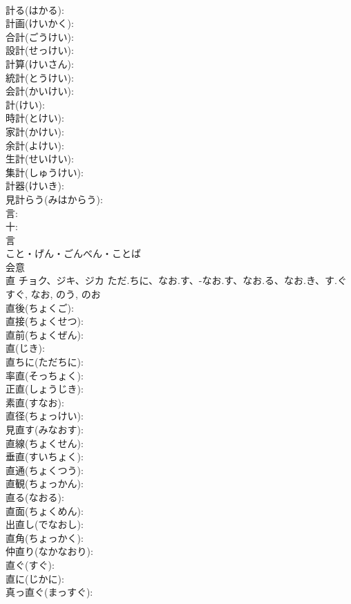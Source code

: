 \documentclass[8pt]{extreport}
\begin{document}
\begin{CJK}{UTF8}{min}
\\	計る(はかる): 
\\	計画(けいかく): 
\\	合計(ごうけい): 
\\	設計(せっけい): 
\\	計算(けいさん): 
\\	統計(とうけい): 
\\	会計(かいけい): 
\\	計(けい): 
\\	時計(とけい): 
\\	家計(かけい): 
\\	余計(よけい): 
\\	生計(せいけい): 
\\	集計(しゅうけい): 
\\	計器(けいき): 
\\	見計らう(みはからう): 
\\	言: 
\\	十: 
\\	言	
\\	こと・げん・ごんべん・ことば	
\\	会意 
\\	直	チョク、ジキ、ジカ	ただ.ちに、なお.す、-なお.す、なお.る、なお.き、す.ぐ	すぐ, なお, のう, のお	
\\	直後(ちょくご): 
\\	直接(ちょくせつ): 
\\	直前(ちょくぜん): 
\\	直(じき): 
\\	直ちに(ただちに): 
\\	率直(そっちょく): 
\\	正直(しょうじき): 
\\	素直(すなお): 
\\	直径(ちょっけい): 
\\	見直す(みなおす): 
\\	直線(ちょくせん): 
\\	垂直(すいちょく): 
\\	直通(ちょくつう): 
\\	直観(ちょっかん): 
\\	直る(なおる): 
\\	直面(ちょくめん): 
\\	出直し(でなおし): 
\\	直角(ちょっかく): 
\\	仲直り(なかなおり): 
\\	直ぐ(すぐ): 
\\	直に(じかに): 
\\	真っ直ぐ(まっすぐ): 

\end{CJK}
\end{document}
